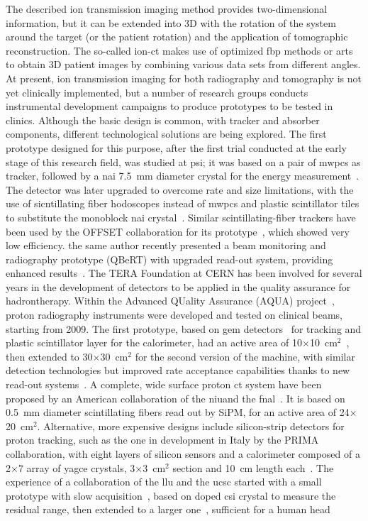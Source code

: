 The described ion transmission imaging method provides two-dimensional information, but it can be extended into 3D with the rotation of the system around the target (or the patient rotation) and the application of tomographic reconstruction. The so-called ion-\gls{ct} makes use of optimized \gls{fbp} methods or \glspl{art} to obtain 3D patient images by combining various data sets from different angles.
At present, ion transmission imaging for both radiography and tomography is not yet clinically implemented, but a number of research groups conducts instrumental development campaigns to produce prototypes to be tested in clinics. Although the basic design is common, with tracker and absorber components, different technological solutions are being explored. The first prototype designed for this purpose, after the first trial conducted at the early stage of this research field, was studied at \gls{psi}; it was based on a pair of \glspl{mwpc} as tracker, followed by a \gls{nai} 7.5~mm diameter crystal for the energy measurement~\parencite{Schneider1995}. The detector was later upgraded to overcome rate and size limitations, with the use of sicntillating fiber hodoscopes instead of \glspl{mwpc} and plastic scintillator tiles to substitute the monoblock \gls{nai} crystal~\parencite{Pemler1999}. Similar scintillating-fiber trackers have been used by the OFFSET collaboration for its prototype~\parencite{Lopresti2014}, which showed very low efficiency. the same author recently presented a beam monitoring and radiography prototype (QBeRT) with upgraded read-out system, providing enhanced results~\parencite{Lopresti2016, Gallo2016}. The TERA Foundation at CERN has been involved for several years in the development of detectors to be applied in the quality assurance for hadrontherapy. Within the Advanced QUality Assurance (AQUA) project~\parencite{Amaldi2010b}, proton radiography instruments were developed and tested on clinical beams, starting from 2009. The first prototype, based on \gls{gem} detectors~\parencite{Sauli1997} for tracking and plastic scintillator layer for the calorimeter, had an active area of 10$\times$10~cm$^2$~\parencite{Amaldi2011}, then extended to 30$\times$30~cm$^2$ for the second version of the machine, with similar detection technologies but improved rate acceptance capabilities thanks to new read-out systems~\parencite{Bucciantonio2013, BucciantonioPhD2015}. A complete, wide surface proton \gls{ct} system have been proposed by an American collaboration of the \gls{niu}and the \gls{fnal}~\parencite{Naimuddin2016}. It is based on 0.5~mm diameter scintillating fibers read out by SiPM, for an active area of 24$\times$20~cm$^2$. Alternative, more expensive designs include silicon-strip detectors for proton tracking, such as the one in development in Italy by the PRIMA collaboration, with eight layers of silicon sensors and a calorimeter composed of a 2$\times$7 array of \gls{yagce} crystals, 3$\times$3~cm$^2$ section and 10~cm length each~\parencite{Scaringella2013}. The experience of a collaboration of the \gls{llu} and the \gls{ucsc} started with a small prototype with slow acquisition~\parencite{Sadrozinsky2011}, based on doped \gls{csi} crystal to measure the residual range, then extended to a larger one~\parencite{Johnson2016}, sufficient for a human head 